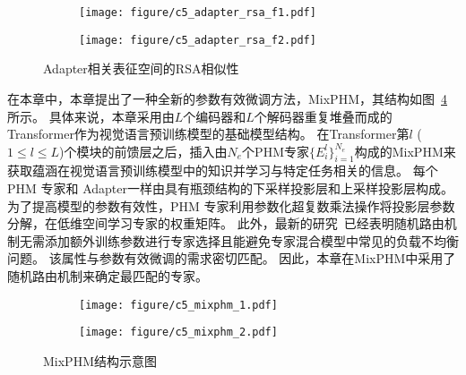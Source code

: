 \begin{figure}[!t]
\begin{subfigure}[b]{.48\linewidth}
\centering
\texttt{[image: figure/c5\_adapter\_rsa\_f1.pdf]}
\end{subfigure}%
\hfill
\begin{subfigure}[b]{.48\linewidth}
\centering
\texttt{[image: figure/c5\_adapter\_rsa\_f2.pdf]}
\end{subfigure}
\caption{Adapter相关表征空间的RSA相似性
}
\label{fig:adapter_rsa}
\end{figure}




在本章中，本章提出了一种全新的参数有效微调方法，MixPHM，其结构如图~\ref{fig:c5_overall}所示。
具体来说，本章采用由$L$个编码器和$L$个解码器重复堆叠而成的Transformer作为视觉语言预训练模型的基础模型结构。
在Transformer第$l$ ($1 \le l \le L$)个模块的前馈层之后，插入由$N_e$个PHM专家$\{E_i^l \}_{i=1}^{N_e}$构成的MixPHM来获取蕴涵在视觉语言预训练模型中的知识并学习与特定任务相关的信息。 
每个 PHM 专家和 Adapter一样由具有瓶颈结构的下采样投影层和上采样投影层构成。
为了提高模型的参数有效性，PHM 专家利用参数化超复数乘法操作将投影层参数分解，在低维空间学习专家的权重矩阵。
此外，最新的研究~\cite{zuo2022taming,wang2022adamix}已经表明随机路由机制无需添加额外训练参数进行专家选择且能避免专家混合模型中常见的负载不均衡问题。
该属性与参数有效微调的需求密切匹配。
因此，本章在MixPHM中采用了随机路由机制来确定最匹配的专家。



\begin{figure}[!t]
\begin{subfigure}[b]{.7\linewidth}
\centering
\texttt{[image: figure/c5\_mixphm\_1.pdf]}
\label{fig:c5_overall_tuning}
\end{subfigure}%
\begin{subfigure}[b]{.3\linewidth}
\centering
\texttt{[image: figure/c5\_mixphm\_2.pdf]}
\label{fig:c5_overall_infer}
\end{subfigure}
\caption{MixPHM结构示意图
}
\label{fig:c5_overall}
\end{figure}


